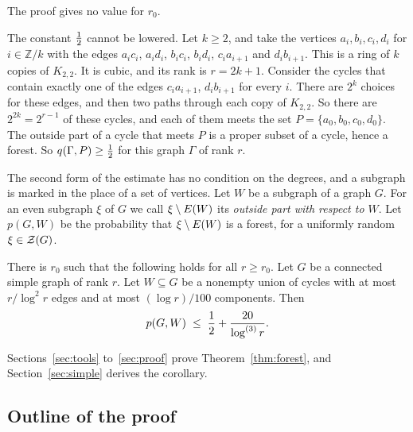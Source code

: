 \documentclass[11pt]{article}
\begin{document}
The proof gives no value for $r_0$.

\begin{fineprint}
The constant $\tfrac12$ cannot be lowered. Let $k\ge2$, and take the vertices $a_i,b_i,c_i,d_i$
for $i\in\mathbb{Z}/k$ with the edges $a_ic_i$, $a_id_i$, $b_ic_i$, $b_id_i$, $c_ia_{i+1}$ and
$d_ib_{i+1}$. This is a ring of $k$ copies of $K_{2,2}$. It is cubic, and its rank is
$r=2k+1$. Consider the cycles that contain exactly one of the edges $c_ia_{i+1}$, $d_ib_{i+1}$
for every $i$. There are $2^{k}$ choices for these edges, and then two paths through each copy
of $K_{2,2}$. So there are $2^{2k}=2^{r-1}$ of these cycles, and each of them meets the set
$P=\{a_0,b_0,c_0,d_0\}$. The outside part of a cycle that meets $P$ is a proper subset of a
cycle, hence a forest. So $q(\Gamma,P)\ge\tfrac12$ for this graph $\Gamma$ of rank $r$.
\end{fineprint}

The second form of the estimate has no condition on the degrees, and a subgraph is marked in
the place of a set of vertices. Let $W$ be a subgraph of a graph $G$. For an even subgraph
$\xi$ of $G$ we call $\xi\setminus E(W)$ its \emph{outside part with respect to $W$}. Let $p(G,W)$ be
the probability that $\xi\setminus E(W)$ is a forest, for a uniformly random $\xi\in\mathcal{Z}(G)$.

\begin{corollary}\label{cor:simple}
There is $r_0$ such that the following holds for all $r\ge r_0$. Let $G$ be a connected simple
graph of rank $r$. Let $W\subseteq G$ be a nonempty union of cycles with at most $r/\log^{2}r$
edges and at most $(\log r)/100$ components. Then
\[
  p(G,W)\;\le\;\frac12+\frac{20}{\log^{(3)}r}.
\]
\end{corollary}

Sections~\ref{sec:tools} to~\ref{sec:proof} prove Theorem~\ref{thm:forest}, and
Section~\ref{sec:simple} derives the corollary.

\subsection{Outline of the proof}
\end{document}
